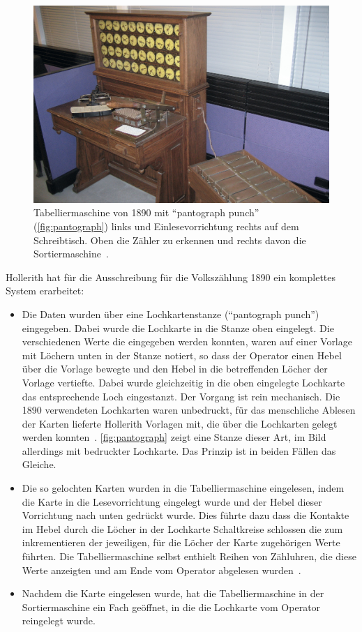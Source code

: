 \documentclass[parskip=half]{scrartcl}
\begin{document}
\begin{figure}[h]
  \centering
  \includegraphics[width=\textwidth]{manuell}
  \caption{Tabelliermaschine von 1890 mit \enquote{pantograph punch}
    (\autoref{fig:pantograph}) links und Einlesevorrichtung rechts auf dem
    Schreibtisch. Oben die Zähler zu erkennen und rechts davon die
    Sortiermaschine~\cite{1890}.}
  \label{fig:1890}
\end{figure}

Hollerith hat für die Ausschreibung für die Volkszählung 1890 ein komplettes
System erarbeitet:

\begin{itemize}
  \item Die Daten wurden über eine Lochkartenstanze (\enquote{pantograph punch})
    eingegeben. Dabei wurde
    die Lochkarte in die Stanze oben eingelegt. Die verschiedenen Werte die
    eingegeben werden konnten, waren auf einer Vorlage mit Löchern unten in
    der Stanze notiert, so dass der Operator einen Hebel über die Vorlage
    bewegte und den Hebel in die betreffenden Löcher der Vorlage vertiefte.
    Dabei wurde gleichzeitig in die oben eingelegte Lochkarte das entsprechende
    Loch eingestanzt. Der Vorgang ist rein mechanisch. Die 1890 verwendeten
    Lochkarten waren unbedruckt, für das menschliche Ablesen der Karten
    lieferte Hollerith Vorlagen mit, die über die Lochkarten gelegt werden
    konnten~\cite{austrian1982herman}. \autoref{fig:pantograph} zeigt eine
    Stanze dieser Art, im Bild allerdings mit bedruckter Lochkarte. Das
    Prinzip ist in beiden Fällen das Gleiche.
  \item Die so gelochten Karten wurden in die Tabelliermaschine eingelesen,
    indem die Karte in die Lesevorrichtung eingelegt wurde und der Hebel dieser
    Vorrichtung nach unten gedrückt wurde. Dies führte dazu dass die Kontakte
    im Hebel durch die Löcher in der Lochkarte Schaltkreise schlossen die zum
    inkrementieren der jeweiligen, für die Löcher der Karte zugehörigen Werte
    führten. Die Tabelliermaschine selbst enthielt Reihen von Zähluhren, die
    diese Werte anzeigten und am Ende vom Operator abgelesen
    wurden~\cite{deutschesMuseum}.
  \item Nachdem die Karte eingelesen wurde, hat die Tabelliermaschine in der
    Sortiermaschine ein Fach geöffnet, in die die Lochkarte vom Operator
    reingelegt wurde.
\end{itemize}
\end{document}
